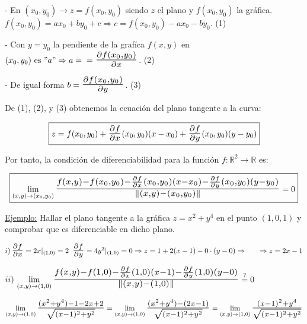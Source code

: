 \documentclass[12pt, titlepage]{article}
\newcommand{\eqc}[1]{\stackrel{\mathclap{\normalfont\mbox{\scriptsize{#1}}}}{=}}
\newcommand{\R}{\mathbb{R}}
\newcommand{\bfrac}[2]{\scalebox{1.4}{$\frac{#1}{#2}$}}
\newcommand{\spac}{\, \, \,}
\begin{document}
- En $(x_0, y_0) \rightarrow  z = f (x_0, y_0)$ siendo $z$ el plano y $f (x_0, y_0)$ la gráfica. $f (x_0, y_0) = 
a x_0 + b y_0 + c \Rightarrow c = f (x_0, y_0) - a x_0 - b y_0$. (1)
\vspace{3mm}

- Con $y = y_0$ la pendiente de la grafíca $f (x, y)$ en $(x_0, y_0) \text{ es } "a" \Rightarrow a = \\ =
\bfrac{\partial f (x_0, y_0)}{\partial x}$. (2)
\vspace{3mm}

- De igual forma $b = \bfrac{\partial f (x_0, y_0)}{\partial y}$. (3)
\vspace{3mm}

De (1), (2), y (3) obtenemos la ecuación del plano tangente a la curva:

\[
\boxed{
z = f (x_0, y_0) + \bfrac{\partial f}{\partial x} (x_0, y_0) (x - x_0) + \bfrac{\partial f}{\partial y} (x_0, y_0) 
(y - y_0)
}
\]

Por tanto, la condición de diferenciabilidad para la función $f : \R^2 \to \R$ \indent es:

\[
\boxed{
\displaystyle \lim_{(x, y) \to (x_0, y_0)} \bfrac{f (x, y) - f  (x_0, y_0) - \frac{\partial f}{\partial x} (x_0, y_0)
(x - x_0) - \frac{\partial f}{\partial y} (x_0, y_0) (y - y_0)}{\|(x, y) - (x_0, y_0)\|} = 0
}
\]
\vspace{3mm}

\underline{Ejemplo:} Hallar el plano tangente a la gráfica $z = x^2 + y^4$ en el punto $(1, 0, 1)$ y 
comprobar que es diferenciable en dicho plano.
\vspace{3mm}

$i) \, \bfrac{\partial f}{\partial x} = 2x |_{(1, 0)} = 2 \spac \bfrac{\partial f}{\partial y} = 4 y^3 |_{(1, 0)} = 
0 \Rightarrow z = 1 + 2(x -1) - 0 \cdot (y - 0) \Rightarrow \\ \indent \Rightarrow z = 2x -1$
\vspace{3mm}

$ii) \, \displaystyle \lim_{(x, y) \to (1, 0)} \bfrac{f (x, y) - f(1, 0) - \frac{\partial f}{\partial x} (1, 0) (x -1) - 
\frac{\partial f}{\partial y} (1, 0) (y - 0)}{\|(x, y) - (1, 0)\|} \eqc{\text{?}} 0$
\vspace{2mm}

$\displaystyle \lim_{(x, y) \to (1, 0)} \bfrac{(x^2 + y^4) - 1 - 2x + 2}{\sqrt{ (x - 1)^2 + y^2}} = \lim_{(x, 
y) \to (1, 0)} \bfrac{(x^2 + y^4) - (2x - 1)}{\sqrt{(x - 1)^2 + y^2}} = \lim_{(x, y) \to (1, 0)} \bfrac{
(x - 1)^2 + y^4}{\sqrt{(x -1)^2 + y^2}}$
\vspace{3mm}
\end{document}
